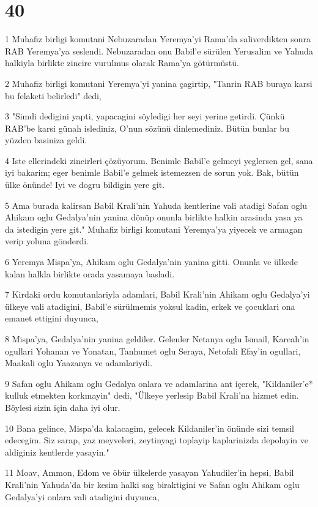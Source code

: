 \chapter{40}

\par 1 Muhafiz birligi komutani Nebuzaradan Yeremya'yi Rama'da saliverdikten sonra RAB Yeremya'ya seslendi. Nebuzaradan onu Babil'e sürülen Yerusalim ve Yahuda halkiyla birlikte zincire vurulmus olarak Rama'ya götürmüstü.
\par 2 Muhafiz birligi komutani Yeremya'yi yanina çagirtip, "Tanrin RAB buraya karsi bu felaketi belirledi" dedi,
\par 3 "Simdi dedigini yapti, yapacagini söyledigi her seyi yerine getirdi. Çünkü RAB'be karsi günah islediniz, O'nun sözünü dinlemediniz. Bütün bunlar bu yüzden basiniza geldi.
\par 4 Iste ellerindeki zincirleri çözüyorum. Benimle Babil'e gelmeyi yeglersen gel, sana iyi bakarim; eger benimle Babil'e gelmek istemezsen de sorun yok. Bak, bütün ülke önünde! Iyi ve dogru bildigin yere git.
\par 5 Ama burada kalirsan Babil Krali'nin Yahuda kentlerine vali atadigi Safan oglu Ahikam oglu Gedalya'nin yanina dönüp onunla birlikte halkin arasinda yasa ya da istedigin yere git." Muhafiz birligi komutani Yeremya'ya yiyecek ve armagan verip yoluna gönderdi.
\par 6 Yeremya Mispa'ya, Ahikam oglu Gedalya'nin yanina gitti. Onunla ve ülkede kalan halkla birlikte orada yasamaya basladi.
\par 7 Kirdaki ordu komutanlariyla adamlari, Babil Krali'nin Ahikam oglu Gedalya'yi ülkeye vali atadigini, Babil'e sürülmemis yoksul kadin, erkek ve çocuklari ona emanet ettigini duyunca,
\par 8 Mispa'ya, Gedalya'nin yanina geldiler. Gelenler Netanya oglu Ismail, Kareah'in ogullari Yohanan ve Yonatan, Tanhumet oglu Seraya, Netofali Efay'in ogullari, Maakali oglu Yaazanya ve adamlariydi.
\par 9 Safan oglu Ahikam oglu Gedalya onlara ve adamlarina ant içerek, "Kildaniler'e* kulluk etmekten korkmayin" dedi, "Ülkeye yerlesip Babil Krali'na hizmet edin. Böylesi sizin için daha iyi olur.
\par 10 Bana gelince, Mispa'da kalacagim, gelecek Kildaniler'in önünde sizi temsil edecegim. Siz sarap, yaz meyveleri, zeytinyagi toplayip kaplarinizda depolayin ve aldiginiz kentlerde yasayin."
\par 11 Moav, Ammon, Edom ve öbür ülkelerde yasayan Yahudiler'in hepsi, Babil Krali'nin Yahuda'da bir kesim halki sag biraktigini ve Safan oglu Ahikam oglu Gedalya'yi onlara vali atadigini duyunca,
